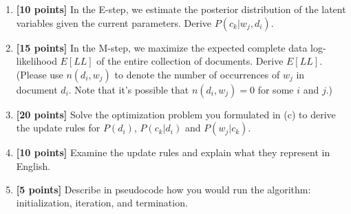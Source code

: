 \begin{enumerate}
\begin{enumerate}
      \item  {\bf [10 points]}
        In the E-step, we estimate the posterior distribution of the latent variables given
        the current parameters. Derive $P(c_k | w_j, d_i)$.

      \item {\bf [15 points]}
        In the M-step, we maximize the expected complete data 
        log-likelihood $E[LL]$ of the entire collection of documents. Derive 
        $E[LL]$. (Please use $n(d_i, w_j)$ to denote the number of occurrences 
        of $w_j$ in document $d_i$. Note that it's possible that 
        $n(d_i, w_j)=0$ for some $i$ and $j$.)

      \item {\bf [20 points]}
        Solve the optimization problem you formulated in (c) to derive the update rules for
        $P(d_i)$, $P(c_k | d_i)$ and $P(w_j | c_k)$.

      \item {\bf [10 points]}
        Examine the update rules and explain what they represent in English. 

      \item {\bf [5 points]}
        Describe in pseudocode how you would run the algorithm: initialization, iteration, 
        and termination. 

    \end{enumerate}


\end{enumerate}
